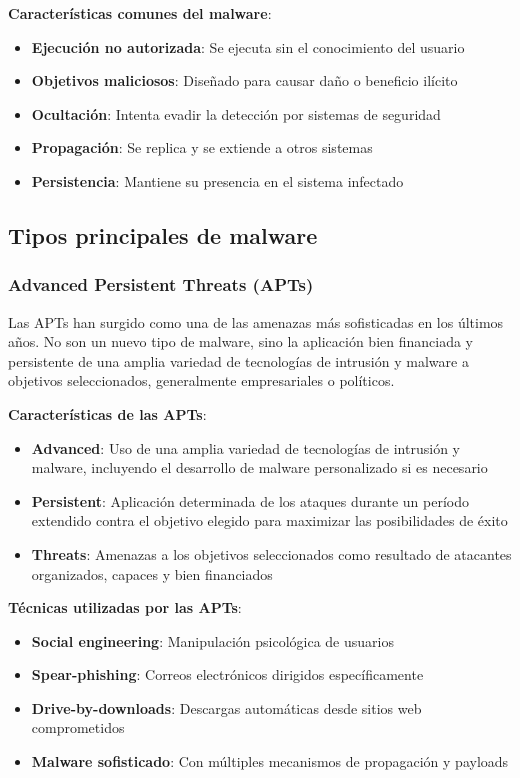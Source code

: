 \textbf{Características comunes del malware}:
\begin{itemize}
    \item \textbf{Ejecución no autorizada}: Se ejecuta sin el conocimiento del usuario
    \item \textbf{Objetivos maliciosos}: Diseñado para causar daño o beneficio ilícito
    \item \textbf{Ocultación}: Intenta evadir la detección por sistemas de seguridad
    \item \textbf{Propagación}: Se replica y se extiende a otros sistemas
    \item \textbf{Persistencia}: Mantiene su presencia en el sistema infectado
\end{itemize}

\subsection{Tipos principales de malware}

\subsubsection{Advanced Persistent Threats (APTs)}

Las APTs han surgido como una de las amenazas más sofisticadas en los últimos años. No son un nuevo tipo de malware, sino la aplicación bien financiada y persistente de una amplia variedad de tecnologías de intrusión y malware a objetivos seleccionados, generalmente empresariales o políticos.

\textbf{Características de las APTs}:
\begin{itemize}
    \item \textbf{Advanced}: Uso de una amplia variedad de tecnologías de intrusión y malware, incluyendo el desarrollo de malware personalizado si es necesario
    \item \textbf{Persistent}: Aplicación determinada de los ataques durante un período extendido contra el objetivo elegido para maximizar las posibilidades de éxito
    \item \textbf{Threats}: Amenazas a los objetivos seleccionados como resultado de atacantes organizados, capaces y bien financiados
\end{itemize}

\textbf{Técnicas utilizadas por las APTs}:
\begin{itemize}
    \item \textbf{Social engineering}: Manipulación psicológica de usuarios
    \item \textbf{Spear-phishing}: Correos electrónicos dirigidos específicamente
    \item \textbf{Drive-by-downloads}: Descargas automáticas desde sitios web comprometidos
    \item \textbf{Malware sofisticado}: Con múltiples mecanismos de propagación y payloads
\end{itemize}

